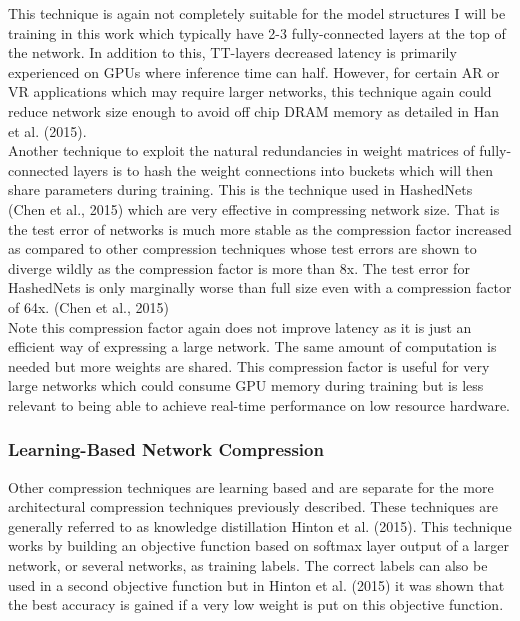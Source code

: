\documentclass{article}
\begin{document}
This technique is again not completely suitable for the model structures I will be training in this work which typically have 2-3 fully-connected layers at the top of the network. In addition to this, TT-layers decreased latency is primarily experienced on GPUs where inference time can half. However, for certain AR or VR applications which may require larger networks, this technique again could reduce network size enough to avoid off chip DRAM memory as detailed in Han et al. (2015). \\

Another technique to exploit the natural redundancies in weight matrices of fully-connected layers is to hash the weight connections into buckets which will then share parameters during training. This is the technique used in HashedNets (Chen et al., 2015) which are very effective in compressing network size. That is the test error of networks is much more stable as the compression factor increased as compared to other compression techniques whose test errors are shown to diverge wildly as the compression factor is more than 8x. The test error for HashedNets is only marginally worse than full size even with a compression factor of 64x. (Chen et al., 2015)\\

Note this compression factor again does not improve latency as it is just an efficient way of expressing a large network. The same amount of computation is needed but more weights are shared. This compression factor is useful for very large networks which could consume GPU memory during training but is less relevant to being able to achieve real-time performance on low resource hardware. 

\subsubsection{Learning-Based Network Compression}
Other compression techniques are learning based and are separate for the more architectural compression techniques previously described. These techniques are generally referred to as knowledge distillation Hinton et al. (2015). This technique works by building an objective function based on softmax layer output of a larger network, or several networks, as training labels. The correct labels can also be used in a second objective function but in Hinton et al. (2015) it was shown that the best accuracy is gained if a very low weight is put on this objective function.\\
\end{document}

